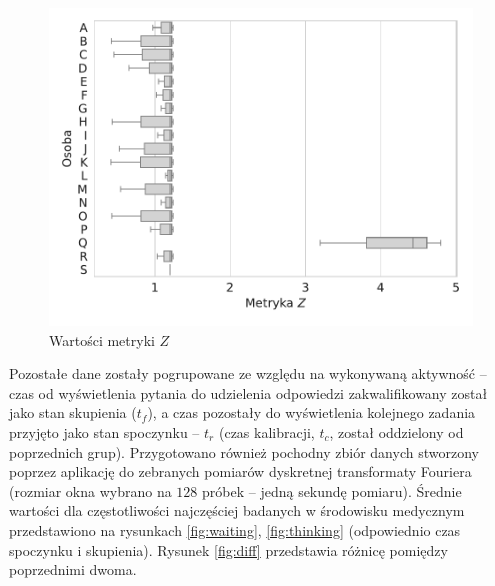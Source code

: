\documentclass{./assets/wfis}
\begin{document}
\begin{figure}[h!]
    \centering
    \includegraphics[width=0.75\columnwidth]{plots/zscore.pdf}
    \caption{Wartości metryki $Z$}
    \label{fig:zscore}
\end{figure}

Pozostałe dane zostały pogrupowane ze względu na wykonywaną aktywność – czas od wyświetlenia pytania do udzielenia odpowiedzi zakwalifikowany został jako stan skupienia ($t_f$), a czas pozostały do wyświetlenia kolejnego zadania przyjęto jako stan spoczynku – $t_r$ (czas kalibracji, $t_c$, został oddzielony od poprzednich grup). 
Przygotowano również pochodny zbiór danych stworzony poprzez aplikację do zebranych pomiarów dyskretnej transformaty Fouriera (rozmiar okna wybrano na $128$ próbek – jedną sekundę pomiaru).  Średnie wartości dla częstotliwości najczęściej badanych w środowisku medycznym przedstawiono na rysunkach \ref{fig:waiting}, \ref{fig:thinking} (odpowiednio czas spoczynku i skupienia). Rysunek \ref{fig:diff} przedstawia różnicę pomiędzy poprzednimi dwoma.
\end{document}
